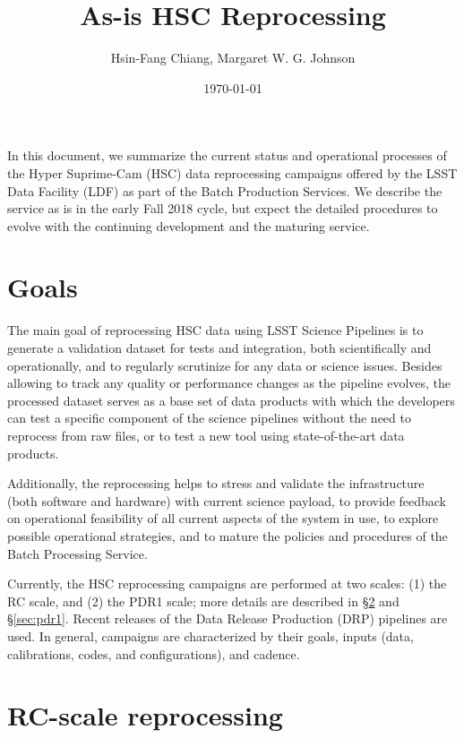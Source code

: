 \documentclass[DM,authoryear,toc]{lsstdoc}
\title{As-is HSC Reprocessing}
\author{%
Hsin-Fang Chiang, Margaret W. G. Johnson
}
\date{\today}
\begin{document}
\maketitle

In this document, we summarize the current status and operational
processes of the Hyper Suprime-Cam (HSC) data reprocessing campaigns
offered by the LSST Data Facility (LDF) as part of the Batch
Production Services. We describe the service as is in the early
Fall 2018 cycle, but expect the detailed procedures to evolve with
the continuing development and the maturing service.

\section{Goals}

The main goal of reprocessing HSC data using LSST Science Pipelines
is to generate a validation dataset for tests and integration, both
scientifically and operationally, and to regularly scrutinize for
any data or science issues.  Besides allowing to track any quality
or performance changes as the pipeline evolves, the processed dataset
serves as a base set of data products with which the developers can
test a specific component of the science pipelines without the need
to reprocess from raw files, or to test a new tool using state-of-the-art
data products.

Additionally, the reprocessing helps to stress and validate the
infrastructure (both software and hardware) with current science
payload, to provide feedback on operational feasibility of all
current aspects of the system in use, to explore possible operational
strategies, and to mature the policies and procedures of the Batch
Processing Service.

Currently, the HSC reprocessing campaigns are performed at two
scales: (1) the RC scale, and (2) the PDR1 scale; more details are
described in \S \ref{sec:rc} and \S \ref{sec:pdr1}. Recent releases
of the Data Release Production (DRP) pipelines are used. In general,
campaigns are characterized by their goals, inputs (data, calibrations,
codes, and configurations), and cadence.

\section{RC-scale reprocessing}
\label{sec:rc}
\end{document}
